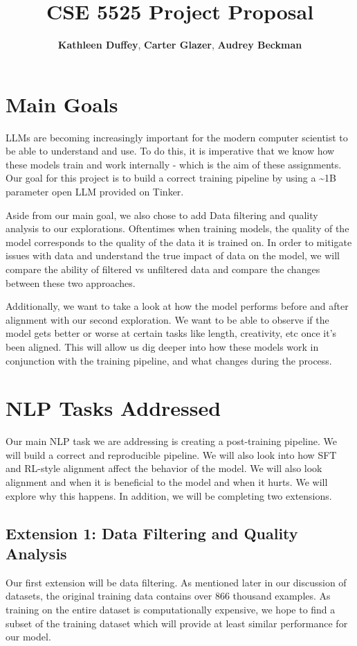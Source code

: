 \documentclass[11pt]{article}
\title{CSE 5525 Project Proposal}
\author{
  \textbf{Kathleen Duffey},
  \textbf{Carter Glazer},
  \textbf{Audrey Beckman}}
\begin{document}
\maketitle

\section{Main Goals}
LLMs are becoming increasingly important for the modern computer scientist to be able to understand and use. To do this, it is imperative that we know how these models train and work internally - which is the aim of these assignments. Our goal for this project is to build a correct training pipeline by using a \~{}1B parameter open LLM provided on Tinker.

Aside from our main goal, we also chose to add Data filtering and quality analysis to our explorations. Oftentimes when training models, the quality of the model corresponds to the quality of the data it is trained on. In order to mitigate issues with data and understand the true impact of data on the model, we will compare the ability of filtered vs unfiltered data and compare the changes between these two approaches.

Additionally, we want to take a look at how the model performs before and after alignment with our second exploration. We want to be able to observe if the model gets better or worse at certain tasks like length, creativity, etc once it's been aligned. This will allow us dig deeper into how these models work in conjunction with the training pipeline, and what changes during the process.

\section{NLP Tasks Addressed}
Our main NLP task we are addressing is creating a post-training pipeline. We will build a correct and reproducible pipeline. We will also look into how SFT and RL-style alignment affect the behavior of the model. We will also look alignment and when it is beneficial to the model and when it hurts. We will explore why this happens. In addition, we will be completing two extensions. 
\subsection{Extension 1: Data Filtering and Quality Analysis}
Our first extension will be data filtering. As mentioned later in our discussion of datasets, the original training data contains over 866 thousand examples. As training on the entire dataset is computationally expensive, we hope to find a subset of the training dataset which will provide at least similar performance for our model. 
\end{document}
